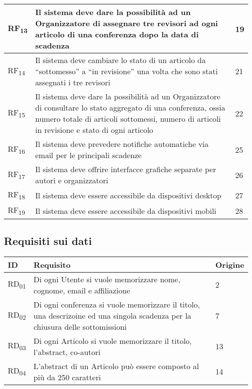 \begin{tabular}{|p{1cm}|p{9cm}|p{1cm}|}
  \hline
  RF\textsubscript{13} & Il sistema deve dare la possibilità ad un Organizzatore di assegnare tre revisori ad ogni articolo di una conferenza dopo la data di scadenza & 19 \\
  \hline
  RF\textsubscript{14} & Il sistema deve cambiare lo stato di un articolo da ``sottomesso'' a ``in revisione'' una volta che sono stati assegnati i tre revisori & 21\\
  \hline
  RF\textsubscript{15} & Il sistema deve dare la possibilità ad un Organizzatore di consultare lo stato aggregato di una conferenza, ossia numero totale di articoli sottomessi, numero di articoli in revisione e stato di ogni articolo & 22 \\
  \hline
  RF\textsubscript{16} & Il sistema deve prevedere notifiche automatiche via email per le principali scadenze & 25 \\
  \hline
  RF\textsubscript{17} & Il sistema deve offrire interfacce grafiche separate per autori e organizzatori & 26\\
  \hline
  RF\textsubscript{18} & Il sistema deve essere accessibile da dispositivi desktop & 27\\
  \hline
  RF\textsubscript{19} & Il sistema deve essere accessibile da dispositivi mobili & 28\\
  \hline
\end{tabular}
\subsection{Requisiti sui dati}
\label{sec:requisiti_dati}
\begin{tabular}{|p{1cm}|p{9cm}|p{1cm}|}
  \hline
  \rowcolor{SkyBlue}
  ID & Requisito & Origine \\
  \hline
  \hline
  RD\textsubscript{01} & Di ogni Utente si vuole memorizzare nome, cognome, email e affiliazione & 2 \\
  \hline
  RD\textsubscript{02} & Di ogni conferenza si vuole memorizzare il titolo, una descrizoine ed una singola scadenza per la chiusura delle sottomissioni & 7\\
  \hline
  RD\textsubscript{03} & Di ogni Articolo si vuole memorizzare il titolo, l'abstract, co-autori & 13 \\
  \hline
  RD\textsubscript{04} & L'abstract di un Articolo può essere composto al più da 250 caratteri & 14 \\
  \hline
\end{tabular}

